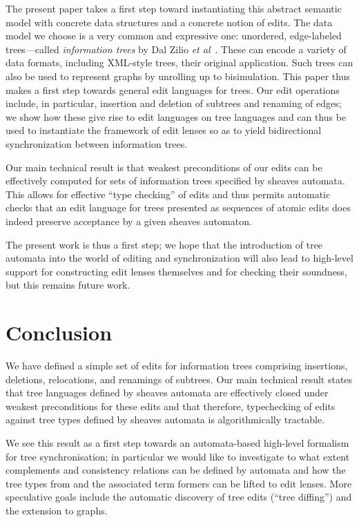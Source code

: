 \documentclass{eceasst}
\begin{document}
The present paper takes a first step
toward instantiating this abstract semantic
model with concrete data structures and a concrete notion of edits.  The
data model we choose is a very common and expressive one: unordered,
edge-labeled trees---called {\em information trees} by Dal Zilio {\em et
  al}~\cite{DalzilioS:POPL04}. These can encode a variety of data formats,
including XML-style trees, their original application.
Such trees can also be used to represent graphs
\cite{UnQL96,Hidaka10} by unrolling up to bisimulation. This paper thus
makes a first step towards general edit languages for trees.  Our edit
operations include, in particular, insertion and deletion of subtrees and
renaming of edges; we show how these give rise to edit languages on tree
languages and can thus be used to instantiate the framework of {edit
  lenses} so as to yield bidirectional synchronization between information
trees.

Our main technical result is that weakest preconditions of our edits
can be effectively computed for sets of information trees specified by
sheaves automata. This allows for effective ``type checking'' of edits
and thus permits automatic checks that an edit language for trees
presented as sequences of atomic edits does indeed preserve acceptance by a
given sheaves automaton.

The present work is thus a first step; we hope that the introduction
of tree automata into the world of editing and synchronization will
also lead to high-level support for constructing edit lenses
themselves and for checking their soundness, but this remains future
work.



\section{Conclusion}
We have defined a simple set of edits for information trees comprising insertions, deletions, relocations, and renamings of subtrees. Our main technical result states that tree languages defined by sheaves automata \cite{DalzilioS:POPL04} are effectively closed under weakest preconditions for these edits and that therefore, typechecking of edits against tree types defined by sheaves automata \cite{Foster:FTL} is algorithmically tractable.

We see this result as a first step towards an automata-based high-level formalism for tree synchronisation; in particular we would like to investigate to what extent complements and consistency relations can be defined by automata and how the tree types from \cite{Foster:FTL} and the associated term formers can be lifted to edit lenses. More speculative goals include the automatic discovery of tree edits (``tree diffing'') and the extension to graphs.



\end{document}
